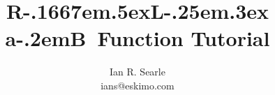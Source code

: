 
\setlength{\parindent}{0in}
\setlength{\textwidth}{6.25in}
\setlength{\oddsidemargin}{0.35in}
\setlength{\evensidemargin}{0in}
\setlength{\parskip}{0.1in}
\setcounter{secnumdepth}{3}
\setcounter{tocdepth}{3}
\newcommand{\defeq}{\stackrel{\triangle}{=}}
\newcommand{\rvec}[4]{{}^{#2}\vec{#1}^{#3}_{#4}}
\newcommand{\bvec}[4]{{}^{#2}{\mbox{\boldmath $#1$}}{}^{#3}_{#4}}
\newcommand{\dbvec}[4]{{}^{#2}\dot{\mbox{\boldmath $#1$}}{}^{#3}_{#4}}
\newcommand{\ddbvec}[4]{{}^{#2}\ddot{\mbox{\boldmath $#1$}}{}^{#3}_{#4}}

\def\RLaB{{\rm R\kern-.1667em\lower.5ex\hbox{L}\kern-.25em\raise.3ex
    \hbox{\sc a}\kern-.2emB}}
\title{\RLaB\ Function Tutorial}
\author{Ian R. Searle \\ ians@eskimo.com}
\date{}


\maketitle

